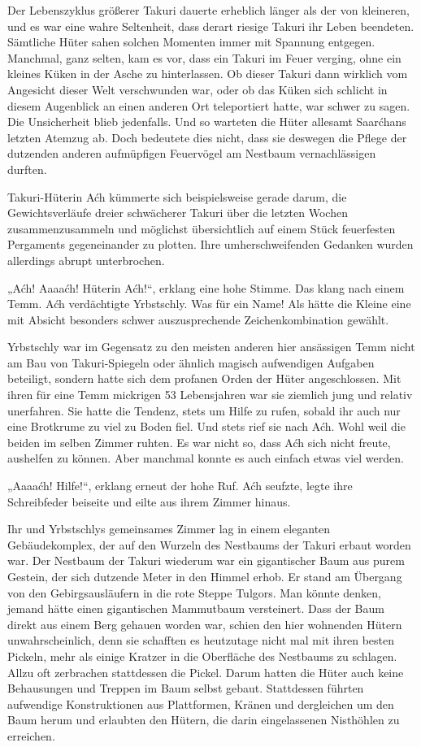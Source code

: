 Der Lebenszyklus größerer Takuri dauerte erheblich länger als der von kleineren, und es war eine wahre Seltenheit, dass derart riesige Takuri ihr Leben beendeten. Sämtliche Hüter sahen solchen Momenten immer mit Spannung entgegen. Manchmal, ganz selten, kam es vor, dass ein Takuri im Feuer verging, ohne ein kleines Küken in der Asche zu hinterlassen. Ob dieser Takuri dann wirklich vom Angesicht dieser Welt verschwunden war, oder ob das Küken sich schlicht in diesem Augenblick an einen anderen Ort teleportiert hatte, war schwer zu sagen. Die Unsicherheit blieb jedenfalls. Und so warteten die Hüter allesamt Saarćhans letzten Atemzug ab. Doch bedeutete dies nicht, dass sie deswegen die Pflege der dutzenden anderen aufmüpfigen Feuervögel am Nestbaum vernachlässigen durften.

Takuri-Hüterin Aćh kümmerte sich beispielsweise gerade darum, die Gewichtsverläufe dreier schwächerer Takuri über die letzten Wochen zusammenzusammeln und möglichst übersichtlich auf einem Stück feuerfesten Pergaments gegeneinander zu plotten. Ihre umherschweifenden Gedanken wurden allerdings abrupt unterbrochen.

„Aćh! Aaaaćh! Hüterin Aćh!“, erklang eine hohe Stimme. Das klang nach einem Temm. Aćh verdächtigte Yrbstschly. Was für ein Name! Als hätte die Kleine eine mit Absicht besonders schwer auszusprechende Zeichenkombination gewählt.

Yrbstschly war im Gegensatz zu den meisten anderen hier ansässigen Temm nicht am Bau von Takuri-Spiegeln oder ähnlich magisch aufwendigen Aufgaben beteiligt, sondern hatte sich dem profanen Orden der Hüter angeschlossen. Mit ihren für eine Temm mickrigen 53 Lebensjahren war sie ziemlich jung und relativ unerfahren. Sie hatte die Tendenz, stets um Hilfe zu rufen, sobald ihr auch nur eine Brotkrume zu viel zu Boden fiel. Und stets rief sie nach Aćh. Wohl weil die beiden im selben Zimmer ruhten. Es war nicht so, dass Aćh sich nicht freute, aushelfen zu können. Aber manchmal konnte es auch einfach etwas viel werden.

„Aaaaćh! Hilfe!“, erklang erneut der hohe Ruf. Aćh seufzte, legte ihre Schreibfeder beiseite und eilte aus ihrem Zimmer hinaus.

Ihr und Yrbstschlys gemeinsames Zimmer lag in einem eleganten Gebäudekomplex, der auf den Wurzeln des Nestbaums der Takuri erbaut worden war. Der Nestbaum der Takuri wiederum war ein gigantischer Baum aus purem Gestein, der sich dutzende Meter in den Himmel erhob. Er stand am Übergang von den Gebirgsausläufern in die rote Steppe Tulgors. Man könnte denken, jemand hätte einen gigantischen Mammutbaum versteinert. Dass der Baum direkt aus einem Berg gehauen worden war, schien den hier wohnenden Hütern unwahrscheinlich, denn sie schafften es heutzutage nicht mal mit ihren besten Pickeln, mehr als einige Kratzer in die Oberfläche des Nestbaums zu schlagen. Allzu oft zerbrachen stattdessen die Pickel. Darum hatten die Hüter auch keine Behausungen und Treppen im Baum selbst gebaut. Stattdessen führten aufwendige Konstruktionen aus Plattformen, Kränen und dergleichen um den Baum herum und erlaubten den Hütern, die darin eingelassenen Nisthöhlen zu erreichen.

